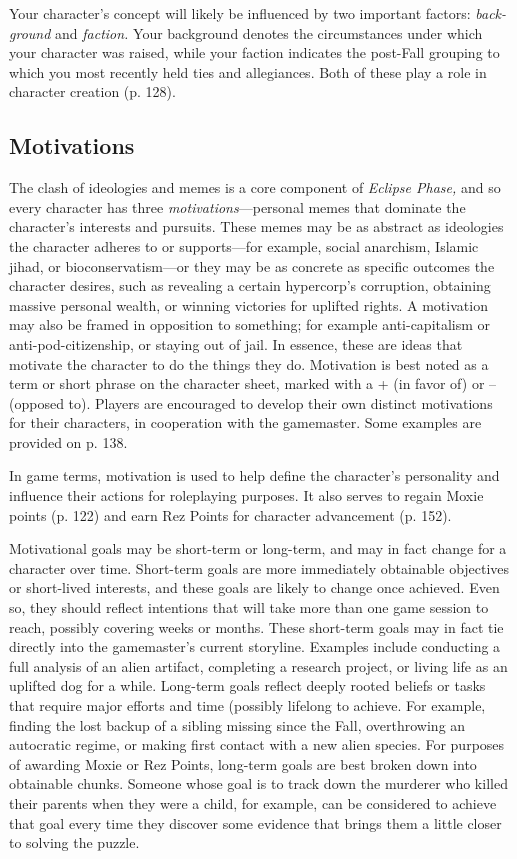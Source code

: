 Your character's concept will likely be 
influenced by two important factors: \textit{back-}
\textit{ground} and \textit{faction.} Your background denotes
the circumstances under which your
character was raised, while your faction 
indicates the post-Fall grouping to which 
you most recently held ties and allegiances. 
Both of these play a role in character creation
(p. 128).

\subsection{Motivations}

The clash of ideologies and memes is a core 
component of \textit{Eclipse Phase,} and so every 
character has three \textit{motivations}—personal 
memes that dominate the character's interests 
and pursuits. These memes may be as abstract
as ideologies the character adheres to
or supports—for example, social anarchism, 
Islamic jihad, or bioconservatism—or they 
may be as concrete as specific outcomes the 
character desires, such as revealing a certain 
hypercorp's corruption, obtaining massive 
personal wealth, or winning victories for 
uplifted rights. A motivation may also be 
framed in opposition to something; for example
anti-capitalism or anti-pod-citizenship,
or staying out of jail. In essence, these are 
ideas that motivate the character to do the 
things they do. Motivation is best noted as a 
term or short phrase on the character sheet, 
marked with a + (in favor of) or – (opposed 
to). Players are encouraged to develop their 
own distinct motivations for their characters, 
in cooperation with the gamemaster. Some 
examples are provided on p. 138.

In game terms, motivation is used to help 
define the character's personality and influence
their actions for roleplaying purposes.
It also serves to regain Moxie points (p. 122) 
and earn Rez Points for character advancement
(p. 152).

Motivational goals may be short-term or long-term, 
and may in fact change for a character over time. 
Short-term goals are more immediately obtainable 
objectives or short-lived interests, and these goals are 
likely to change once achieved. Even so, they should 
reflect intentions that will take more than one game 
session to reach, possibly covering weeks or months. 
These short-term goals may in fact tie directly into the 
gamemaster's current storyline. Examples include conducting
a full analysis of an alien artifact, completing
a research project, or living life as an uplifted dog for a 
while. Long-term goals reflect deeply rooted beliefs or 
tasks that require major efforts and time (possibly lifelong
to achieve. For example, finding the lost backup
of a sibling missing since the Fall, overthrowing an 
autocratic regime, or making first contact with a new 
alien species. For purposes of awarding Moxie or Rez 
Points, long-term goals are best broken down into 
obtainable chunks. Someone whose goal is to track 
down the murderer who killed their parents when they 
were a child, for example, can be considered to achieve 
that goal every time they discover some evidence that 
brings them a little closer to solving the puzzle.

